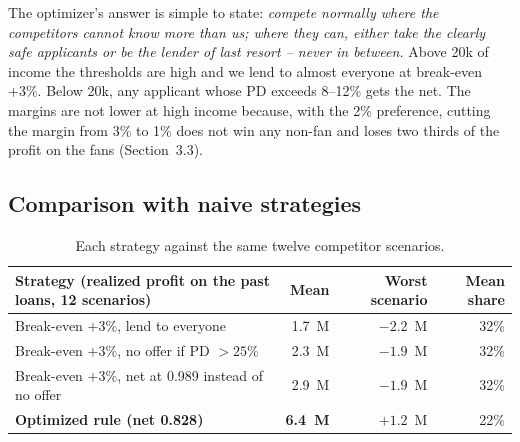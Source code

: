 \documentclass[11pt,a4paper]{article}
\newcommand{\meur}{M\texteuro}
\begin{document}
The optimizer's answer is simple to state: \emph{compete normally where the competitors cannot know more than
us; where they can, either take the clearly safe applicants or be the lender of last resort -- never in
between.} Above 20k of income the thresholds are high and we lend to almost everyone at break-even $+3\%$. Below
20k, any applicant whose PD exceeds 8--12\% gets the net. The margins are not lower at high income because, with
the 2\% preference, cutting the margin from 3\% to 1\% does not win any non-fan and loses two thirds of the
profit on the fans (Section~3.3).

\subsection{Comparison with naive strategies}
\begin{table}[h]\centering\small
\begin{tabular}{lrrr}
\toprule
Strategy (realized profit on the past loans, 12 scenarios) & Mean & Worst scenario & Mean share\\
\midrule
Break-even $+3\%$, lend to everyone                 & 1.7~\meur{} & $-2.2$~\meur{} & 32\%\\
Break-even $+3\%$, no offer if PD $> 25\%$           & 2.3~\meur{} & $-1.9$~\meur{} & 32\%\\
Break-even $+3\%$, net at 0.989 instead of no offer & 2.9~\meur{} & $-1.9$~\meur{} & 32\%\\
\textbf{Optimized rule (net 0.828)}                  & \textbf{6.4~\meur{}} & $\mathbf{+1.2}$~\meur{} & 22\%\\
\bottomrule
\end{tabular}
\caption{Each strategy against the same twelve competitor scenarios.}
\label{tab:strategies}
\end{table}
\end{document}
